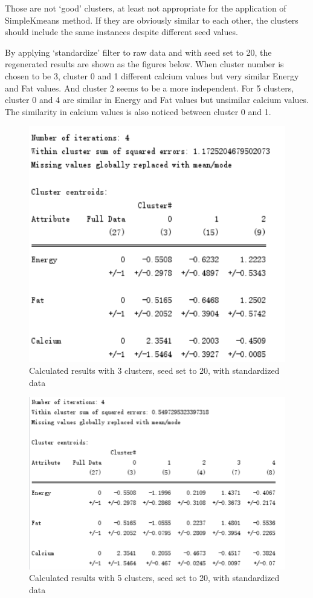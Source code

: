 \documentclass[
]{article}
\begin{document}
Those are not `good' clusters, at least not appropriate for the
application of SimpleKmeans method. If they are obviously similar to
each other, the clusters should include the same instances despite
different seed values.

By applying `standardize' filter to raw data and with seed set to 20,
the regenerated results are shown as the figures below. When cluster
number is chosen to be 3, cluster 0 and 1 different calcium values but
very similar Energy and Fat values. And cluster 2 seems to be a more
independent. For 5 clusters, cluster 0 and 4 are similar in Energy and
Fat values but unsimilar calcium values. The similarity in calcium
values is also noticed between cluster 0 and 1.

\begin{figure}
\centering
\includegraphics[width=5.20833in,height=\textheight]{Pictures/6.png}
\caption{Calculated results with 3 clusters, seed set to 20, with
standardized data}
\end{figure}

\begin{figure}
\centering
\includegraphics[width=6.25in,height=\textheight]{Pictures/7.png}
\caption{Calculated results with 5 clusters, seed set to 20, with
standardized data}
\end{figure}
\end{document}
